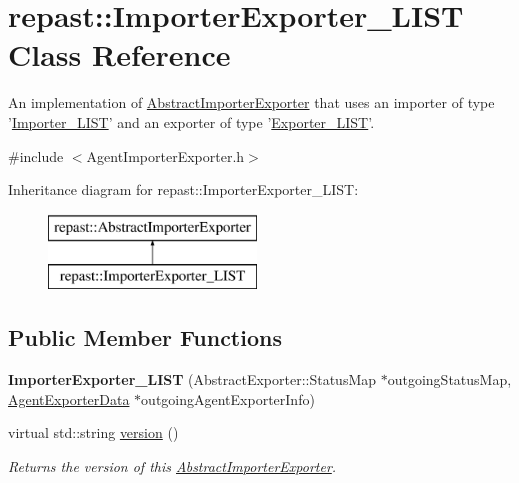 \hypertarget{classrepast_1_1_importer_exporter___l_i_s_t}{\section{repast\-:\-:Importer\-Exporter\-\_\-\-L\-I\-S\-T Class Reference}
\label{classrepast_1_1_importer_exporter___l_i_s_t}
}


An implementation of \hyperlink{classrepast_1_1_abstract_importer_exporter}{Abstract\-Importer\-Exporter} that uses an importer of type '\hyperlink{classrepast_1_1_importer___l_i_s_t}{Importer\-\_\-\-L\-I\-S\-T}' and an exporter of type '\hyperlink{classrepast_1_1_exporter___l_i_s_t}{Exporter\-\_\-\-L\-I\-S\-T}'.  




{\ttfamily \#include $<$Agent\-Importer\-Exporter.\-h$>$}

Inheritance diagram for repast\-:\-:Importer\-Exporter\-\_\-\-L\-I\-S\-T\-:\begin{figure}[H]
\begin{center}
\leavevmode
\includegraphics[height=2.000000cm]{classrepast_1_1_importer_exporter___l_i_s_t}
\end{center}
\end{figure}
\subsection*{Public Member Functions}
\begin{DoxyCompactItemize}
\item 
\hypertarget{classrepast_1_1_importer_exporter___l_i_s_t_abefea36aba632900932b731688615724}{{\bfseries Importer\-Exporter\-\_\-\-L\-I\-S\-T} (Abstract\-Exporter\-::\-Status\-Map $\ast$outgoing\-Status\-Map, \hyperlink{classrepast_1_1_agent_exporter_data}{Agent\-Exporter\-Data} $\ast$outgoing\-Agent\-Exporter\-Info)}\label{classrepast_1_1_importer_exporter___l_i_s_t_abefea36aba632900932b731688615724}

\item 
virtual std\-::string \hyperlink{classrepast_1_1_importer_exporter___l_i_s_t_a548c16411acb6e380e9e27139148e294}{version} ()
\begin{DoxyCompactList}\small\item\em Returns the version of this \hyperlink{classrepast_1_1_abstract_importer_exporter}{Abstract\-Importer\-Exporter}. \end{DoxyCompactList}\end{DoxyCompactItemize}
